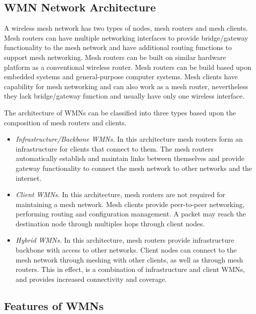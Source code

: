 \subsection{WMN Network Architecture}

A wireless mesh network has two types of nodes, mesh routers and mesh clients. Mesh routers can have multiple networking interfaces to provide bridge/gateway functionality to the mesh network and have additional routing functions to support mesh networking. Mesh routers can be built on similar hardware platform as a conventional wireless router. Mesh routers can be build based upon embedded systems and general-purpose computer systems. Mesh clients have capability for mesh networking and can also work as a mesh router, nevertheless they lack bridge/gateway function and usually have only one wireless interface.


The architecture of WMNs can be classified into three types based upon the composition of mesh routers and clients.

\begin{itemize}
	\item \textit{Infrastructure/Backbone WMNs.}
	In this architecture mesh routers form an infrastructure for clients that connect to them. The mesh routers automatically establish and maintain links between themselves and provide gateway functionality to connect the mesh network to other networks and the internet. 
	
	\item \textit{Client WMNs.} In this architecture, mesh routers are not required for maintaining a mesh network. Mesh clients provide peer-to-peer networking, performing routing and configuration management. A packet may reach the destination node through multiples hops through client nodes.
	  
	\item \textit{Hybrid WMNs.} In this architecture, mesh routers provide infrastructure backbone with access to other networks. Client nodes can connect to the mesh network through meshing with other clients, as well as through mesh routers. This in effect, is a combination of infrastructure and client WMNs, and provides increased connectivity and coverage.
\end{itemize}

\subsection{Features of WMNs}

